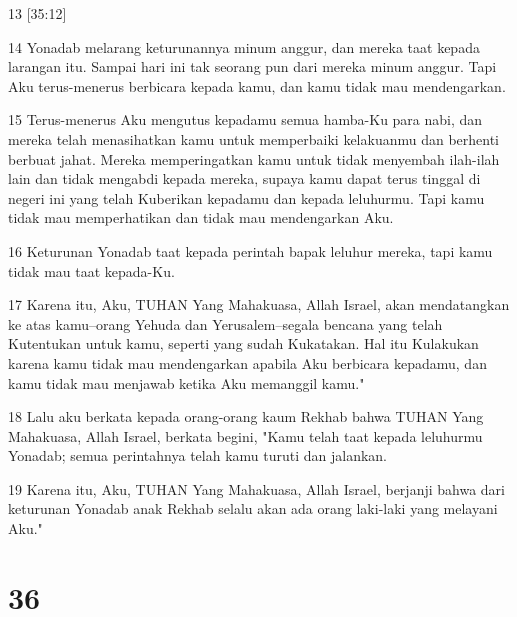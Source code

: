 \par 13 [35:12]
\par 14 Yonadab melarang keturunannya minum anggur, dan mereka taat kepada larangan itu. Sampai hari ini tak seorang pun dari mereka minum anggur. Tapi Aku terus-menerus berbicara kepada kamu, dan kamu tidak mau mendengarkan.
\par 15 Terus-menerus Aku mengutus kepadamu semua hamba-Ku para nabi, dan mereka telah menasihatkan kamu untuk memperbaiki kelakuanmu dan berhenti berbuat jahat. Mereka memperingatkan kamu untuk tidak menyembah ilah-ilah lain dan tidak mengabdi kepada mereka, supaya kamu dapat terus tinggal di negeri ini yang telah Kuberikan kepadamu dan kepada leluhurmu. Tapi kamu tidak mau memperhatikan dan tidak mau mendengarkan Aku.
\par 16 Keturunan Yonadab taat kepada perintah bapak leluhur mereka, tapi kamu tidak mau taat kepada-Ku.
\par 17 Karena itu, Aku, TUHAN Yang Mahakuasa, Allah Israel, akan mendatangkan ke atas kamu--orang Yehuda dan Yerusalem--segala bencana yang telah Kutentukan untuk kamu, seperti yang sudah Kukatakan. Hal itu Kulakukan karena kamu tidak mau mendengarkan apabila Aku berbicara kepadamu, dan kamu tidak mau menjawab ketika Aku memanggil kamu."
\par 18 Lalu aku berkata kepada orang-orang kaum Rekhab bahwa TUHAN Yang Mahakuasa, Allah Israel, berkata begini, "Kamu telah taat kepada leluhurmu Yonadab; semua perintahnya telah kamu turuti dan jalankan.
\par 19 Karena itu, Aku, TUHAN Yang Mahakuasa, Allah Israel, berjanji bahwa dari keturunan Yonadab anak Rekhab selalu akan ada orang laki-laki yang melayani Aku."

\chapter{36}

